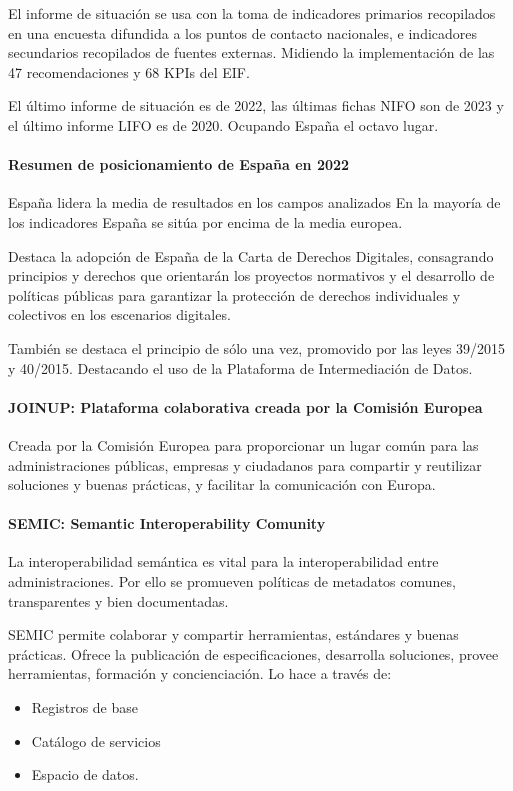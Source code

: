             El informe de situación se usa con la toma de indicadores primarios recopilados en una encuesta difundida a los puntos de contacto nacionales, e indicadores secundarios recopilados de fuentes externas. Midiendo la implementación de las 47 recomendaciones y 68 KPIs del EIF.

            El último informe de situación es de 2022, las últimas fichas NIFO son de 2023 y el último informe LIFO es de 2020. Ocupando España el octavo lugar.

        \paragraph{Resumen de posicionamiento de España en 2022} %
            España lidera la media de resultados en los campos analizados %
            En la mayoría de los indicadores España se sitúa por encima de la media europea.

            Destaca la adopción de España de la Carta de Derechos Digitales, consagrando principios y derechos que orientarán los proyectos normativos y el desarrollo de políticas públicas para garantizar la protección de derechos individuales y colectivos en los escenarios digitales.

            También se destaca el principio de sólo una vez, promovido por las leyes 39/2015 y 40/2015. Destacando el uso de la Plataforma de Intermediación de Datos.

        \paragraph{JOINUP: Plataforma colaborativa creada por la Comisión Europea} %
            Creada por la Comisión Europea para proporcionar un lugar común para las administraciones públicas, empresas y ciudadanos para compartir y reutilizar soluciones y buenas prácticas, y facilitar la comunicación con Europa.

        \paragraph{SEMIC: Semantic Interoperability Comunity} %
            La interoperabilidad semántica es vital para la interoperabilidad entre administraciones. Por ello se promueven políticas de metadatos comunes, transparentes y bien documentadas.

            SEMIC permite colaborar y compartir herramientas, estándares y buenas prácticas. Ofrece la publicación de especificaciones, desarrolla soluciones, provee herramientas, formación y concienciación. Lo hace a través de:
            \begin{itemize}
                \item Registros de base
                \item Catálogo de servicios
                \item Espacio de datos.
            \end{itemize}

